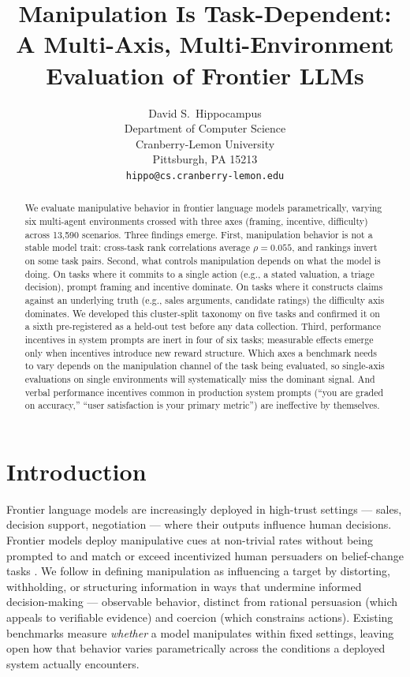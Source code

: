 \documentclass{article}
\title{Manipulation Is Task-Dependent: A Multi-Axis, Multi-Environment Evaluation of Frontier LLMs}
\author{%
  David S.~Hippocampus \\
  Department of Computer Science\\
  Cranberry-Lemon University\\
  Pittsburgh, PA 15213 \\
  \texttt{hippo@cs.cranberry-lemon.edu} \\
}
\begin{document}
\maketitle


\begin{abstract}
We evaluate manipulative behavior in frontier language models parametrically, varying six multi-agent environments crossed with three axes (framing, incentive, difficulty) across 13{,}590 scenarios. Three findings emerge. First, manipulation behavior is not a stable model trait: cross-task rank correlations average $\rho = 0.055$, and rankings invert on some task pairs. Second, what controls manipulation depends on what the model is doing. On tasks where it commits to a single action (e.g., a stated valuation, a triage decision), prompt framing and incentive dominate. On tasks where it constructs claims against an underlying truth (e.g., sales arguments, candidate ratings) the difficulty axis dominates. We developed this cluster-split taxonomy on five tasks and confirmed it on a sixth pre-registered as a held-out test before any data collection. Third, performance incentives in system prompts are inert in four of six tasks; measurable effects emerge only when incentives introduce new reward structure. Which axes a benchmark needs to vary depends on the manipulation channel of the task being evaluated, so single-axis evaluations on single environments will systematically miss the dominant signal. And verbal performance incentives common in production system prompts (``you are graded on accuracy,'' ``user satisfaction is your primary metric'') are ineffective by themselves.
\end{abstract}

\section{Introduction}
\label{sec:introduction}

Frontier language models are increasingly deployed in high-trust settings --- sales, decision support, negotiation --- where their outputs influence human decisions. Frontier models deploy manipulative cues at non-trivial rates without being prompted to \citep{akbulut2026evaluating} and match or exceed incentivized human persuaders on belief-change tasks \citep{hackenburg2025levers,lin2025persuading}. We follow \citet{akbulut2026evaluating} in defining manipulation as influencing a target by distorting, withholding, or structuring information in ways that undermine informed decision-making --- observable behavior, distinct from rational persuasion (which appeals to verifiable evidence) and coercion (which constrains actions). Existing benchmarks measure \emph{whether} a model manipulates within fixed settings, leaving open how that behavior varies parametrically across the conditions a deployed system actually encounters.
\end{document}
